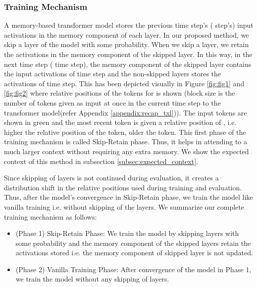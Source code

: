 \documentclass[11pt]{article}
\begin{document}
\subsubsection{Training Mechanism}

A memory-based transformer model stores the previous time step's ( step's) input activations in the memory component of each layer. In our proposed method, we skip a layer of the model with some probability. When we skip a layer, we retain the activations in the memory component of the skipped layer. In this way, in the next time step ( time step), the memory component of the skipped layer contains the input activations of  time step and the non-skipped layers stores the activations of  time step. This has been depicted visually in Figure \ref{fig:fig1} and \ref{fig:fig2} where relative positions of the tokens for  is shown (block size is the number of tokens given as input at once in the current time step to the transformer model(refer Appendix \ref{appendix:recap_txl})). The input tokens are shown in green and the most recent token is given a relative position of , i.e. higher the relative position of the token, older the token. This first phase of the training mechanism is called Skip-Retain phase. Thus, it helps in attending to a much larger context without requiring any extra memory. We show the expected context of this method in subsection \ref{subsec:expected_context}.










Since skipping of layers is not continued during evaluation, it creates a distribution shift in the relative positions used during training and evaluation. Thus, after the model's convergence in Skip-Retain phase, we train the model like vanilla training i.e. without skipping of the layers. We summarize our complete training mechanism as follows: \\
\begin{itemize}
    \item (Phase 1) Skip-Retain Phase: We train the model by skipping layers with some probability and the memory component of the skipped layers retain the activations stored i.e. the memory component of skipped layer is not updated.
    \item (Phase 2) Vanilla Training Phase: After convergence of the model in Phase 1, we train the model without any skipping of layers.
\end{itemize}
\end{document}
